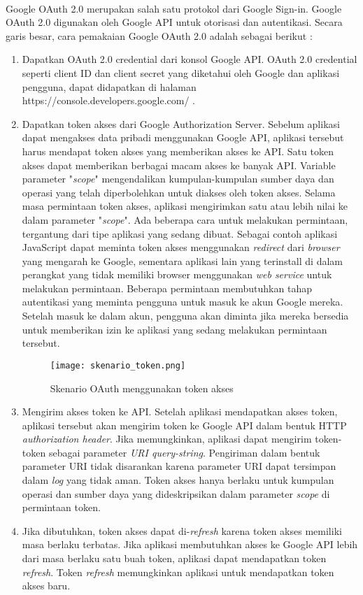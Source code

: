 \paragraph{} Google OAuth 2.0 merupakan salah satu protokol dari Google Sign-in. Google OAuth 2.0 digunakan oleh Google API untuk otorisasi dan autentikasi. Secara garis besar, cara pemakaian Google OAuth 2.0 adalah sebagai berikut : 
	\begin{enumerate}
  	\item Dapatkan OAuth 2.0 credential dari konsol Google API. OAuth 2.0 credential seperti client ID dan client secret yang diketahui oleh Google dan aplikasi pengguna, dapat didapatkan di halaman https://console.developers.google.com/ .
  	\item Dapatkan token akses dari Google Authorization Server. Sebelum aplikasi dapat mengakses data pribadi menggunakan Google API, aplikasi tersebut harus mendapat token akses yang memberikan akses ke API. Satu token akses dapat memberikan berbagai macam akses ke banyak API. Variable parameter "\textit{scope}" mengendalikan kumpulan-kumpulan sumber daya dan operasi yang telah diperbolehkan untuk diakses oleh token akses. Selama masa permintaan token akses, aplikasi mengirimkan satu atau lebih nilai ke dalam parameter "\textit{scope}". Ada beberapa cara untuk melakukan permintaan, tergantung dari tipe aplikasi yang sedang dibuat. Sebagai contoh aplikasi JavaScript dapat meminta token akses menggunakan \textit{redirect} dari \textit{browser} yang mengarah ke Google, sementara aplikasi lain yang terinstall di dalam perangkat yang tidak memiliki browser menggunakan \textit{web service} untuk melakukan permintaan. Beberapa permintaan membutuhkan tahap autentikasi yang meminta pengguna untuk masuk ke akun Google mereka. Setelah masuk ke dalam akun, pengguna akan diminta jika mereka bersedia untuk memberikan izin ke aplikasi yang sedang melakukan permintaan tersebut.
  	\begin{figure} [H]
	\centering  
	\texttt{[image: skenario\_token.png]}  
	\caption[Skenario OAuth menggunakan token akses]{Skenario OAuth menggunakan token akses} 
	\label{fig:skenario-token} 
\end{figure}
  	\item Mengirim akses token ke API. Setelah aplikasi mendapatkan akses token, aplikasi tersebut akan mengirim token ke Google API dalam bentuk HTTP \textit{authorization header}. Jika memungkinkan, aplikasi dapat mengirim token-token sebagai parameter \textit{URI query-string}. Pengiriman dalam bentuk parameter URI tidak disarankan karena parameter URI dapat tersimpan dalam \textit{log} yang tidak aman. Token akses hanya berlaku untuk kumpulan operasi dan sumber daya yang dideskripsikan dalam parameter \textit{scope} di permintaan token. 
	\item Jika dibutuhkan, token akses dapat di-\textit{refresh} karena token akses memiliki masa berlaku terbatas. Jika aplikasi membutuhkan akses ke Google API lebih dari masa berlaku satu buah token, aplikasi dapat mendapatkan token \textit{refresh}. Token \textit{refresh} memungkinkan aplikasi untuk mendapatkan token akses baru.
  
\end{enumerate}

